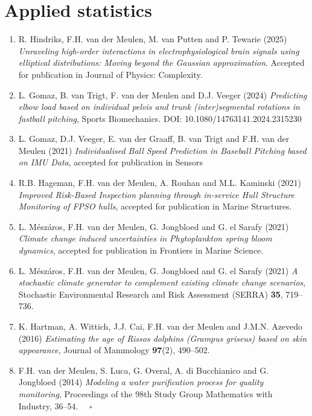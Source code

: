 \documentclass[
10pt, %
a4paper, %
oneside, %
headinclude,footinclude, %
BCOR5mm, %
]{scrartcl}
\begin{document}
\section{Applied  statistics}

\begin{enumerate}
\item  {\sc R. Hindriks, F.H. van der Meulen, M. van Putten and P. Tewarie} (2025) {\it Unraveling high-order interactions in electrophysiological brain signals using elliptical distributions: Moving beyond the Gaussian approximation}. Accepted for publication in Journal of Physics: Complexity.

\item {\sc L. Gomaz, B. van Trigt, F. van der Meulen and D.J. Veeger} (2024) {\it Predicting elbow load based on individual pelvis and trunk (inter)segmental rotations in fastball pitching}, Sports Biomechanics. DOI: 10.1080/14763141.2024.2315230

\item {\sc L. Gomaz, D.J. Veeger, E. van der Graaff, B. van Trigt and F.H. van der Meulen (2021)} {\it  Individualised Ball Speed Prediction in Baseball Pitching based on IMU Data}, accepted for publication in Sensors

\item {\sc R.B. Hageman, F.H. van der Meulen, A. Rouhan and M.L. Kaminski (2021)} {\it  Improved Risk-Based Inspection planning through in-service Hull Structure Monitoring of FPSO hulls}, accepted for publication in Marine Structures.

\item {\sc L. M\'esz\'aros, F.H. van der Meulen, G. Jongbloed and G. el Sarafy (2021)} {\it Climate change induced uncertainties in Phytoplankton spring bloom dynamics}, accepted for publication in Frontiers in Marine Science.


\item {\sc L. M\'esz\'aros, F.H. van der Meulen, G. Jongbloed and G. el Sarafy (2021)} {\it  A stochastic climate generator to complement existing climate change scenarios}, Stochastic Environmental Research and Risk Assessment (SERRA) {\bf 35}, 719--736.

\item {\sc K. Hartman, A. Wittich, J.J. Cai, F.H. van der Meulen and J.M.N. Azevedo (2016)} {\it  Estimating the age of Rissos dolphins (Grampus griseus) based on skin appearance},  Journal of Mammology {\bf 97}(2), 490--502.

\item {\sc F.H. van der Meulen, S. Luca, G. Overal, A. di Bucchianico and G. Jongbloed (2014)} {\it  Modeling a water purification process for quality monitoring}, Proceedings of the 98th Study Group Mathematics with Industry, 36--54.\hspace*{\fill}  $\quad \square$


\end{enumerate}
\end{document}
